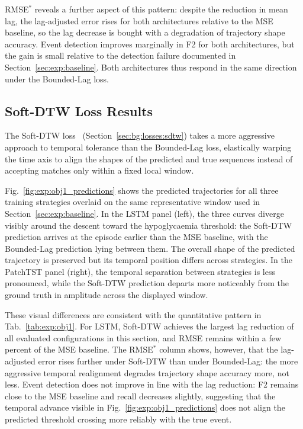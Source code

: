 RMSE$^*$ reveals a further aspect of this pattern: despite the reduction in mean lag, the lag-adjusted error rises for both architectures relative to the MSE baseline, so the lag decrease is bought with a degradation of trajectory shape accuracy. Event detection improves marginally in F2 for both architectures, but the gain is small relative to the detection failure documented in Section~\ref{sec:exp:baseline}. Both architectures thus respond in the same direction under the Bounded-Lag loss.

\subsection{Soft-DTW Loss Results}

The Soft-DTW loss~\citep{cuturi2017softdtw} (Section~\ref{sec:bg:losses:sdtw}) takes a more aggressive approach to temporal tolerance than the Bounded-Lag loss, elastically warping the time axis to align the shapes of the predicted and true sequences instead of accepting matches only within a fixed local window.

Fig.~\ref{fig:exp:obj1_predictions} shows the predicted trajectories for all three training strategies overlaid on the same representative window used in Section~\ref{sec:exp:baseline}. In the LSTM panel (left), the three curves diverge visibly around the descent toward the hypoglycaemia threshold: the Soft-DTW prediction arrives at the episode earlier than the MSE baseline, with the Bounded-Lag prediction lying between them. The overall shape of the predicted trajectory is preserved but its temporal position differs across strategies. In the PatchTST panel (right), the temporal separation between strategies is less pronounced, while the Soft-DTW prediction departs more noticeably from the ground truth in amplitude across the displayed window.

These visual differences are consistent with the quantitative pattern in Tab.~\ref{tab:exp:obj1}. For LSTM, Soft-DTW achieves the largest lag reduction of all evaluated configurations in this section, and RMSE remains within a few percent of the MSE baseline. The RMSE$^*$ column shows, however, that the lag-adjusted error rises further under Soft-DTW than under Bounded-Lag: the more aggressive temporal realignment degrades trajectory shape accuracy more, not less. Event detection does not improve in line with the lag reduction: F2 remains close to the MSE baseline and recall decreases slightly, suggesting that the temporal advance visible in Fig.~\ref{fig:exp:obj1_predictions} does not align the predicted threshold crossing more reliably with the true event.

